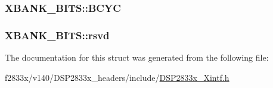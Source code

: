 \subsubsection[{B\+C\+Y\+C}]{ X\+B\+A\+N\+K\+\_\+\+B\+I\+T\+S\+::\+B\+C\+Y\+C}\label{struct_x_b_a_n_k___b_i_t_s_a58b19085c8c651e658a81ac78382007e}
\hypertarget{struct_x_b_a_n_k___b_i_t_s_a4a99af7871b2c81857440e1c414f3247}{}
\subsubsection[{rsvd}]{ X\+B\+A\+N\+K\+\_\+\+B\+I\+T\+S\+::rsvd}\label{struct_x_b_a_n_k___b_i_t_s_a4a99af7871b2c81857440e1c414f3247}


The documentation for this struct was generated from the following file\+:\begin{DoxyCompactItemize}
\item 
f2833x/v140/\+D\+S\+P2833x\+\_\+headers/include/\hyperlink{_d_s_p2833x___xintf_8h}{D\+S\+P2833x\+\_\+\+Xintf.\+h}\end{DoxyCompactItemize}
